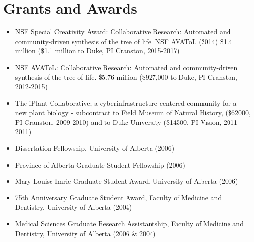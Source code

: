 \documentclass[10pt]{article}
\begin{document}

\section*{Grants and Awards}
\begin{itemize}
\item{NSF Special Creativity Award: Collaborative Research: Automated and community-driven synthesis of the tree of life. NSF AVAToL (2014) \$1.4 million (\$1.1 million to Duke, PI Cranston, 2015-2017)}
\item{NSF AVAToL: Collaborative Research: Automated and community-driven synthesis of the tree of life. \$5.76 million (\$927,000 to Duke, PI Cranston, 2012-2015)}
\item{The iPlant Collaborative; a cyberinfrastructure-centered community for a new plant biology - subcontract to Field Museum of Natural History, (\$62000, PI Cranston, 2009-2010) and to Duke University (\$14500, PI Vision, 2011-2011)}
\item{Dissertation Fellowship, University of Alberta (2006)}
\item{Province of Alberta Graduate Student Fellowship (2006)}
\item{Mary Louise Imrie Graduate Student Award, University of Alberta (2006)}
\item{75th Anniversary Graduate Student Award, Faculty of Medicine and Dentistry, University of Alberta (2004)}
\item{Medical Sciences Graduate Research Assistantship, Faculty of Medicine and Dentistry, University of Alberta (2006 \& 2004)}
\end{itemize}
\end{document}
